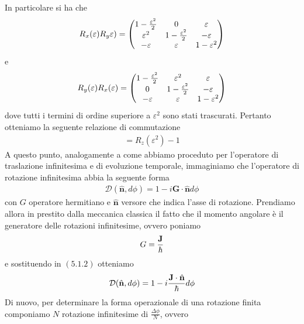 \documentclass{article}
\begin{document}
In particolare si ha che
\begin{gather}
    R_x(\varepsilon)R_y\varepsilon) = \begin{pmatrix}
        1 - \frac{\varepsilon^2}{2} & 0 & \varepsilon \\
        \varepsilon^2 & 1 - \frac{\varepsilon^2}{2} & -\varepsilon \\
        -\varepsilon & \varepsilon & 1 - \varepsilon^2
    \end{pmatrix} \notag
\end{gather}
e
\begin{gather}
    R_y(\varepsilon)R_x(\varepsilon) = \begin{pmatrix}
        1 - \frac{\varepsilon^2}{2} & \varepsilon^2 & \varepsilon \\
        0 & 1 - \frac{\varepsilon^2}{2} & -\varepsilon \\
        -\varepsilon & \varepsilon & 1 - \varepsilon^2
    \end{pmatrix} \notag
\end{gather}
dove tutti i termini di ordine superiore a $\varepsilon^2$ sono stati trascurati. Pertanto otteniamo la seguente relazione di commutazione
\begin{gather}
    [R_x(\varepsilon), R_y(\varepsilon)] = R_z(\varepsilon^2) - 1 \tag{5.1.1}
\end{gather}
A questo punto, analogamente a come abbiamo proceduto per l'operatore di traslazione infinitesima e di evoluzione temporale, immaginiamo che l'operatore di rotazione infinitesima abbia la seguente forma
\begin{gather}
    \mathcal{D}(\hat{\mathbf{n}}, d\phi) = 1 - i\mathbf{G} \cdot \hat{\mathbf{n}}d\phi \tag{5.1.2}
\end{gather}
con $G$ operatore hermitiano e $\hat{\mathbf{n}}$ versore che indica l'asse di rotazione. Prendiamo allora in prestito dalla meccanica classica il fatto che il momento angolare è il generatore delle rotazioni infinitesime, ovvero
poniamo
\begin{gather}
    G = \frac{\mathbf{J}}{\hbar} \notag
\end{gather}
e sostituendo in $(5.1.2)$ otteniamo
\begin{gather}
    \mathcal{D}(\hat{\mathbf{n}}, d\phi) = 1 - i\frac{\mathbf{J} \cdot \hat{\mathbf{n}}}{\hbar}d\phi \notag
\end{gather}
Di nuovo, per determinare la forma operazionale di una rotazione finita componiamo $N$ rotazione infinitesime di $\frac{\Delta \phi}{N}$, ovvero
\end{document}
